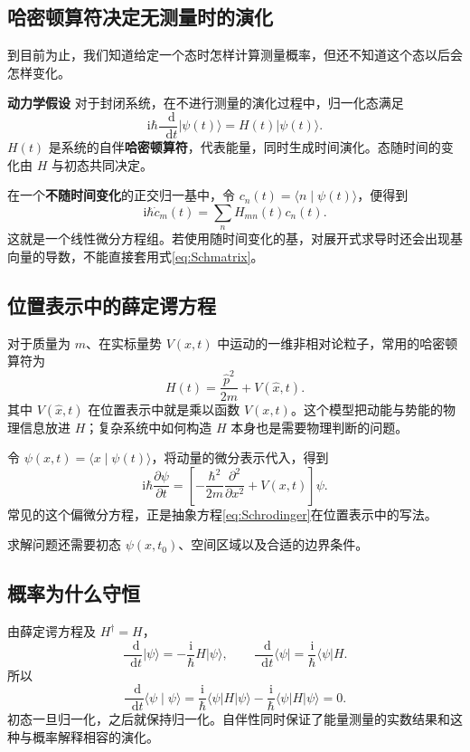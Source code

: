 \documentclass[a4paper,11pt]{article}
\numberwithin{equation}{section}
\newcommand{\ii}{\mathrm{i}}
\newcommand{\dd}{\mathop{}\!\mathrm{d}}
\newcommand{\ket}[1]{\lvert #1\rangle}
\newcommand{\bra}[1]{\langle #1\rvert}
\newcommand{\braket}[2]{\langle #1\mid #2\rangle}
\newcommand{\mel}[3]{\langle #1\rvert #2\lvert #3\rangle}
\newcommand{\important}[1]{\par\noindent\textbf{#1}\quad}
\begin{document}
\subsection{哈密顿算符决定无测量时的演化}
到目前为止，我们知道给定一个态时怎样计算测量概率，但还不知道这个态以后会怎样变化。

\important{动力学假设}
对于封闭系统，在不进行测量的演化过程中，归一化态满足
\begin{equation}\label{eq:Schrodinger}
  \boxed{\ii\hbar\frac{\dd}{\dd t}\ket{\psi(t)}
  =H(t)\ket{\psi(t)}.}
\end{equation}
$H(t)$ 是系统的自伴\textbf{哈密顿算符}，代表能量，同时生成时间演化。态随时间的变化由 $H$ 与初态共同决定。


在一个\textbf{不随时间变化}的正交归一基中，令 $c_n(t)=\braket{n}{\psi(t)}$，便得到
\begin{equation}\label{eq:Schmatrix}
  \ii\hbar\dot c_m(t)=\sum_n H_{mn}(t)c_n(t).
\end{equation}
这就是一个线性微分方程组。若使用随时间变化的基，对展开式求导时还会出现基向量的导数，不能直接套用式\eqref{eq:Schmatrix}。

\subsection{位置表示中的薛定谔方程}
对于质量为 $m$、在实标量势 $V(x,t)$ 中运动的一维非相对论粒子，常用的哈密顿算符为
\begin{equation}\label{eq:Hparticle}
  H(t)=\frac{\hat p^2}{2m}+V(\hat x,t).
\end{equation}
其中 $V(\hat x,t)$ 在位置表示中就是乘以函数 $V(x,t)$。这个模型把动能与势能的物理信息放进 $H$；复杂系统中如何构造 $H$ 本身也是需要物理判断的问题。

令 $\psi(x,t)=\braket{x}{\psi(t)}$，将动量的微分表示代入，得到
\begin{equation}\label{eq:Schwave}
  \boxed{\ii\hbar\frac{\partial\psi}{\partial t}
  =\left[-\frac{\hbar^2}{2m}\frac{\partial^2}{\partial x^2}
  +V(x,t)\right]\psi.}
\end{equation}
常见的这个偏微分方程，正是抽象方程\eqref{eq:Schrodinger}在位置表示中的写法。

求解问题还需要初态 $\psi(x,t_0)$、空间区域以及合适的边界条件。

\subsection{概率为什么守恒}
由薛定谔方程及 $H^\dagger=H$，
\[
  \frac{\dd}{\dd t}\ket{\psi}=-\frac{\ii}{\hbar}H\ket{\psi},
  \qquad
  \frac{\dd}{\dd t}\bra{\psi}=\frac{\ii}{\hbar}\bra{\psi}H.
\]
所以
\begin{equation}
  \frac{\dd}{\dd t}\braket{\psi}{\psi}
  =\frac{\ii}{\hbar}\mel{\psi}{H}{\psi}
  -\frac{\ii}{\hbar}\mel{\psi}{H}{\psi}=0.
\end{equation}
初态一旦归一化，之后就保持归一化。自伴性同时保证了能量测量的实数结果和这种与概率解释相容的演化。
\end{document}
